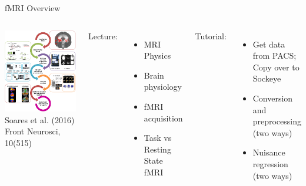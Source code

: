 \documentclass[aspectratio=169,xcolor=dvipsnames]{beamer}
\begin{document}

\begin{frame}{fMRI Overview}
\begin{columns}[c]
\includegraphics[width=1\textwidth]{imgs/fmri_overview}
\tiny{Soares et al. (2016) Front Neurosci, 10(515)}

Lecture:
\begin{itemize}
\item MRI Physics
\item Brain physiology
\item fMRI acquisition
\item Task vs Resting State fMRI
\end{itemize}

Tutorial:
\begin{itemize}
\item Get data from PACS; Copy over to Sockeye
\item Conversion and preprocessing (two ways)
\item Nuisance regression (two ways)
\end{itemize}
\end{columns}

\end{frame}
\end{document}
